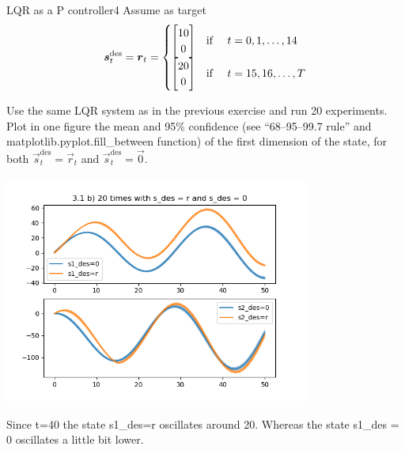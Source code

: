 \begin{questions}
\begin{question}{LQR as a P controller}{4}
	Assume as target 
	\begin{align}
        \vec s^\text{des}_t = \vec r_t = \begin{cases}
        \begin{bmatrix}
        10\\
        0
        \end{bmatrix}  & \text{if \quad} t=0,1,\ldots,14
        \\
        \begin{bmatrix}
        20\\
        0
        \end{bmatrix}  & \text{if \quad} t=15,16,\ldots,T
        \end{cases}	
	\end{align}
    
    Use the same LQR system as in the previous exercise and run 20 experiments. Plot in one figure the mean and 95\% confidence (see ``68--95--99.7 rule'' and matplotlib.pyplot.fill\_between function) of the first dimension of the state, for both $\vec s^\text{des}_t = \vec r_t$ and $\vec s^\text{des}_t = \vec 0$.
\end{question}
\begin{answer}
\begin{center}
	\includegraphics[width=0.75\textwidth]{img/1b_20.png}
\end{center}

Since t=40 the state s1\_des=r oscillates around 20. Whereas the state s1\_des = 0 oscillates a little bit lower.
	
\end{answer}


	

\end{questions}
